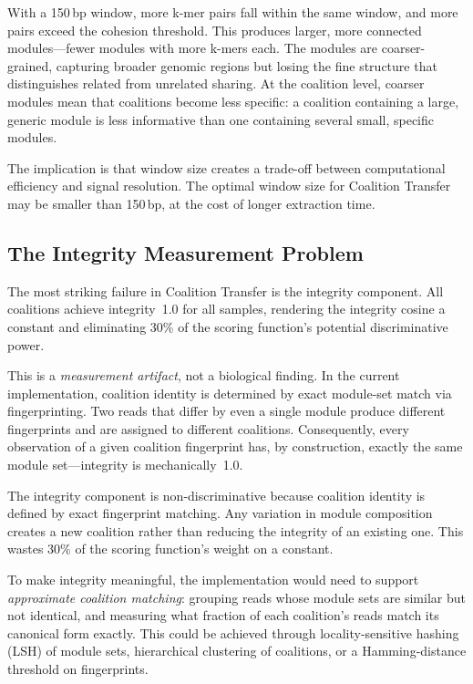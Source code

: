 \documentclass{../yalumba}
\begin{document}
With a 150\,bp window, more k-mer pairs fall within the same window, and
more pairs exceed the cohesion threshold.  This produces larger, more
connected modules---fewer modules with more k-mers each.  The modules are
coarser-grained, capturing broader genomic regions but losing the fine
structure that distinguishes related from unrelated sharing.  At the
coalition level, coarser modules mean that coalitions become less specific:
a coalition containing a large, generic module is less informative than one
containing several small, specific modules.

The implication is that window size creates a trade-off between computational
efficiency and signal resolution.  The optimal window size for Coalition
Transfer may be smaller than 150\,bp, at the cost of longer extraction time.

\subsection{The Integrity Measurement Problem}
\label{sec:discussion-integrity}

The most striking failure in Coalition Transfer is the integrity component.
All coalitions achieve integrity~1.0 for all samples, rendering the integrity
cosine a constant and eliminating 30\% of the scoring function's potential
discriminative power.

This is a \emph{measurement artifact}, not a biological finding.  In the
current implementation, coalition identity is determined by exact module-set
match via fingerprinting.  Two reads that differ by even a single module
produce different fingerprints and are assigned to different coalitions.
Consequently, every observation of a given coalition fingerprint has, by
construction, exactly the same module set---integrity is mechanically~1.0.

\begin{limitation}
The integrity component is non-discriminative because coalition identity is
defined by exact fingerprint matching.  Any variation in module composition
creates a new coalition rather than reducing the integrity of an existing one.
This wastes 30\% of the scoring function's weight on a constant.
\end{limitation}

To make integrity meaningful, the implementation would need to support
\emph{approximate coalition matching}: grouping reads whose module sets are
similar but not identical, and measuring what fraction of each coalition's
reads match its canonical form exactly.  This could be achieved through
locality-sensitive hashing (LSH) of module sets, hierarchical clustering
of coalitions, or a Hamming-distance threshold on fingerprints.
\end{document}
